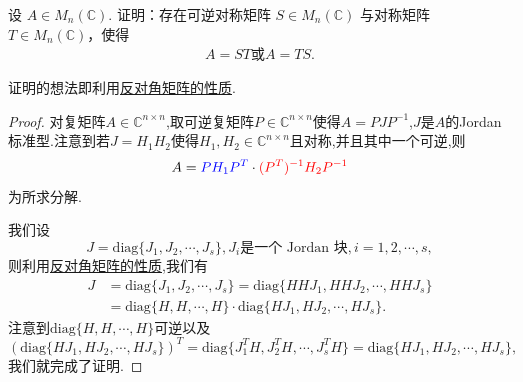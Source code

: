 \documentclass[../../main.tex]{subfiles}%
\begin{document}
\begin{proposition}
设 $A \in M_n(\mathbb{C})$. 证明：存在可逆对称矩阵 $S \in M_n(\mathbb{C})$ 与对称矩阵 $T \in M_n(\mathbb{C})$，使得
\begin{align*}
A = ST\text{或}A=TS.
\end{align*}
\end{proposition}
\begin{note}
证明的想法即利用\hyperref[lemma:反对角矩阵的性质]{反对角矩阵的性质}.
\end{note}
\begin{proof}
对复矩阵\( A \in \mathbb{C}^{n \times n} \),取可逆复矩阵\( P \in \mathbb{C}^{n \times n} \)使得\( A = P J P^{-1} \),\( J \)是\( A \)的Jordan标准型.注意到若\( J = H_1 H_2 \)使得\( H_1, H_2 \in \mathbb{C}^{n \times n} \)且对称,并且其中一个可逆,则
\[
A = {\color{blue} P H_1 P^T} \cdot {\color{red} (P^T)^{-1} H_2 P^{-1}}
\]
为所求分解.

我们设
\[
J = \text{diag}\{J_1, J_2, \cdots, J_s\}, J_i \text{是一个 Jordan 块}, i = 1, 2, \cdots, s,
\]
则利用\hyperref[lemma:反对角矩阵的性质]{反对角矩阵的性质},我们有
\[
\begin{aligned}
J &= \text{diag}\{J_1, J_2, \cdots, J_s\} = \text{diag}\{HHJ_1, HHJ_2, \cdots, HHJ_s\} \\
&= \text{diag}\{H, H, \cdots, H\} \cdot \text{diag}\{HJ_1, HJ_2, \cdots, HJ_s\}.
\end{aligned}
\]
注意到\( \text{diag}\{H, H, \cdots, H\} \)可逆以及
\[
(\text{diag}\{HJ_1, HJ_2, \cdots, HJ_s\})^T = \text{diag}\{J_1^T H, J_2^T H, \cdots, J_s^T H\} = \text{diag}\{HJ_1, HJ_2, \cdots, HJ_s\},
\]
我们就完成了证明.
\end{proof}
\end{document}
